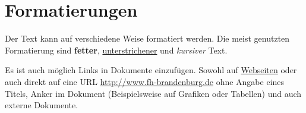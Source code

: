 \section{Formatierungen}

Der Text kann auf verschiedene Weise formatiert werden.
Die meist genutzten Formatierung sind \textbf{fetter}, \underline{unterstrichener} und \textit{kursiver} Text.

Es ist auch möglich Links in Dokumente einzufügen.
Sowohl auf \href{http://www.fh-brandenburg.de}{Webseiten} oder auch direkt auf eine URL \url{http://www.fh-brandenburg.de} ohne Angabe eines Titels, Anker im Dokument (Beispielsweise auf Grafiken oder Tabellen) und auch externe Dokumente.

